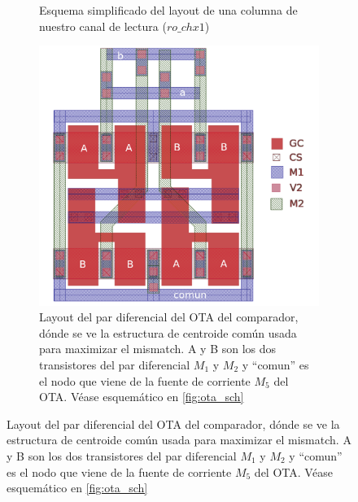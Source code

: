 \begin{figure}[h]
	\centering
	\begin{subfigure}{0.45\textwidth}
		
		\caption{Esquema simplificado del layout de una columna de nuestro canal de lectura ($ro\_chx1$)}
		\label{fig:ro_chx1}
	\end{subfigure}
	\qquad %
	\begin{subfigure}{0.45\textwidth}
		\includegraphics[width=\textwidth]{img/OTA_simple_layout.png}
		\caption{Layout del par diferencial del OTA del comparador, dónde se ve
		la estructura de centroide común usada para maximizar el mismatch.
		A y B son los dos transistores del par diferencial $M_1$ y $M_2$ y ``comun'' es
		el nodo que viene de la fuente de corriente $M_5$ del OTA. Véase
		esquemático en \ref{fig:ota_sch}}
		\label{fig:ota_simple_layout}
	\end{subfigure}
\end{figure}
